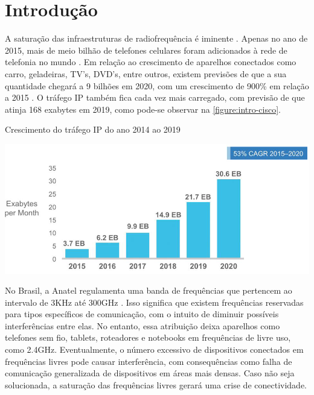 	\chapter*[Introdução]{Introdução} %

	A saturação das infraestruturas de radiofrequência é iminente \cite{load-balancing}. Apenas no ano de 2015, mais de meio bilhão de telefones celulares foram adicionados à rede de telefonia no mundo \cite{cisco-forecast}. Em relação ao crescimento de aparelhos conectados como carro, geladeiras, TV’s, DVD’s, entre outros, existem previsões de que a sua quantidade chegará a 9 bilhões em 2020, com um crescimento de 900\% em relação a 2015 \cite{erricson-report}. O tráfego IP também fica cada vez mais carregado, com previsão de que atinja 168 exabytes em 2019, como pode-se observar na \autoref{figure:intro-cisco}.

	\begin{chart}[ht!]
		\caption{\label{figure:intro-cisco}Crescimento do tráfego IP do ano 2014 ao 2019}
		\begin{center}
			\includegraphics[scale=0.5]{cisco_exabytes_per_month.png}
		\end{center}
	\end{chart}

	No Brasil, a Anatel regulamenta uma banda de frequências que pertencem ao intervalo  de 3KHz até 300GHz \cite{faixa-anatel}. Isso significa que existem frequências reservadas para tipos específicos de comunicação, com o intuito de diminuir possíveis interferências entre elas. No entanto, essa atribuição deixa aparelhos como telefones sem fio, tablets, roteadores e notebooks em frequências de livre uso, como 2.4GHz. Eventualmente, o número excessivo de dispositivos conectados em  frequências livres pode causar interferência, com consequências como falha de comunicação generalizada de dispositivos em áreas mais densas. Caso não seja solucionada, a saturação das frequências livres gerará uma crise de conectividade. \par

